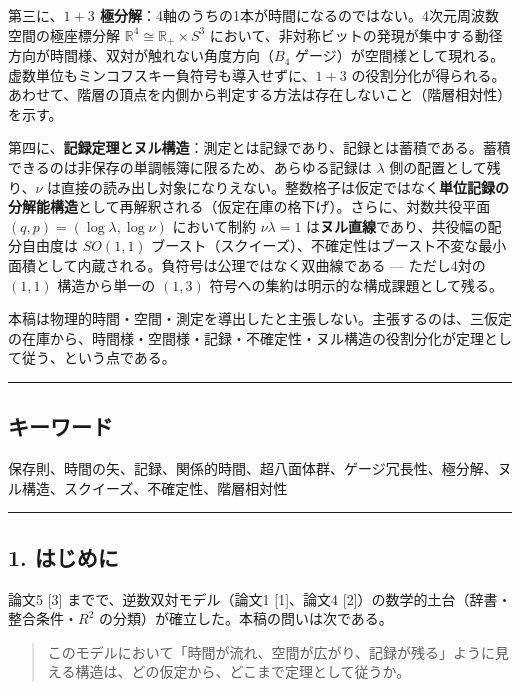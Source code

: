 \documentclass[
]{ltjsarticle}
\begin{document}
第三に、\textbf{\(1{+}3\)
極分解}：4軸のうちの1本が時間になるのではない。4次元周波数空間の極座標分解
\(\mathbb{R}^4\cong\mathbb{R}_+\times S^3\)
において、非対称ビットの発現が集中する動径方向が時間様、双対が触れない角度方向（\(B_4\)
ゲージ）が空間様として現れる。虚数単位もミンコフスキー負符号も導入せずに、\(1{+}3\)
の役割分化が得られる。あわせて、階層の頂点を内側から判定する方法は存在しないこと（階層相対性）を示す。

第四に、\textbf{記録定理とヌル構造}：測定とは記録であり、記録とは蓄積である。蓄積できるのは非保存の単調帳簿に限るため、あらゆる記録は
\(\lambda\) 側の配置として残り、\(\nu\)
は直接の読み出し対象になりえない。整数格子は仮定ではなく\textbf{単位記録の分解能構造}として再解釈される（仮定在庫の格下げ）。さらに、対数共役平面
\((q,p)=(\log\lambda,\log\nu)\) において制約 \(\nu\lambda=1\)
は\textbf{ヌル直線}であり、共役幅の配分自由度は \(SO(1,1)\)
ブースト（スクイーズ）、不確定性はブースト不変な最小面積として内蔵される。負符号は公理ではなく双曲線である
--- ただし4対の \((1,1)\) 構造から単一の \((1,3)\)
符号への集約は明示的な構成課題として残る。

本稿は物理的時間・空間・測定を導出したと主張しない。主張するのは、三仮定の在庫から、時間様・空間様・記録・不確定性・ヌル構造の役割分化が定理として従う、という点である。

\begin{center}\rule{0.5\linewidth}{0.5pt}\end{center}

\subsection{キーワード}\label{ux30adux30fcux30efux30fcux30c9}

保存則、時間の矢、記録、関係的時間、超八面体群、ゲージ冗長性、極分解、ヌル構造、スクイーズ、不確定性、階層相対性

\begin{center}\rule{0.5\linewidth}{0.5pt}\end{center}

\subsection{1. はじめに}\label{ux306fux3058ux3081ux306b}

論文5 {[}3{]} までで、逆数双対モデル（論文1 {[}1{]}、論文4
{[}2{]}）の数学的土台（辞書・整合条件・\(R^2\)
の分類）が確立した。本稿の問いは次である。

\begin{quote}
このモデルにおいて「時間が流れ、空間が広がり、記録が残る」ように見える構造は、どの仮定から、どこまで定理として従うか。
\end{quote}
\end{document}
